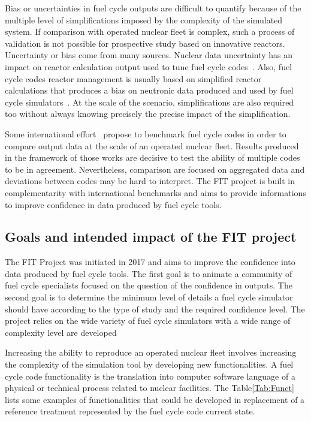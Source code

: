 Bias or uncertainties in fuel cycle outputs are difficult to quantify because of
the multiple level of simplifications imposed by the complexity of the simulated
system. If comparison with operated nuclear fleet is complex, such a process of
validation is not possible for prospective study based on innovative reactors.
Uncertainty or bias come from many sources. Nuclear data uncertainty has an
impact on reactor calculation output used to tune fuel cycle
codes~\cite{Krivtchik_2014}. Also, fuel cycle codes reactor management is
usually based on simplified reactor calculations that produces a bias on
neutronic data produced and used by fuel cycle simulators~\cite{Somaini_2017}.
At the scale of the scenario, simplifications are also required too without
always knowing precisely the precise impact of the simplification. 

Some international effort~\cite{NEA2016} propose to benchmark fuel cycle codes
in order to compare output data at the scale of an operated nuclear fleet.
Results produced in the framework of those works are decisive to test the
ability of multiple codes to be in agreement. Nevertheless, comparison are
focused on aggregated data and deviations between codes may be hard to
interpret. The FIT project is built in complementarity with international
benchmarks and aims to provide informations to improve confidence in data
produced by fuel cycle tools.

\subsection{Goals and intended impact of the FIT project}

The FIT Project was initiated in 2017 and aims to improve the confidence into
data produced by fuel cycle tools. The first goal is to animate a community of
fuel cycle specialists focused on the question of the confidence in outputs. The
second goal is to determine the minimum level of details a fuel cycle simulator
should have according to the type of study and the required confidence level.
The project relies on the wide variety of fuel cycle simulators with a wide
range of complexity level are developed

Increasing the ability to reproduce an operated nuclear fleet involves
increasing the complexity of the simulation tool by developing new
functionalities. A fuel cycle code functionality is the translation into
computer software language of a physical or technical process related to nuclear
facilities. The Table\ref{Tab:Funct} lists some examples of functionalities that
could be developed in replacement of a reference treatment represented by the
fuel cycle code current state.

